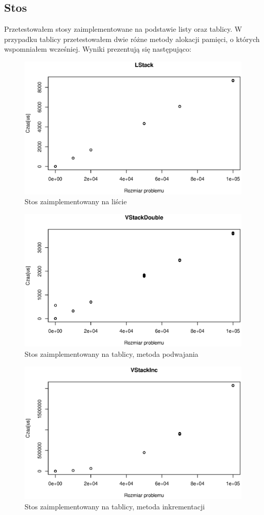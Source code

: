 \documentclass[10pt,a4paper]{article}
\begin{document}
\subsection{Stos}

Przetestowałem stosy zaimplementowane na podstawie listy oraz tablicy. W przypadku tablicy
przetestowałem dwie różne metody alokacji pamięci, o których wspomniałem wcześniej. Wyniki 
prezentują się następująco:

\begin{figure}[H]
	\centering
	\includegraphics[width=0.7\linewidth]{./Wykresy/LStack}
	\caption{Stos zaimplementowany na liście}
	\label{fig:LStack}
\end{figure}

\begin{figure}[H]
	\centering
	\includegraphics[width=0.7\linewidth]{./Wykresy/VStackDouble}
	\caption{Stos zaimplementowany na tablicy, metoda podwajania}
	\label{fig:VStackDouble}
\end{figure}

\begin{figure}[H]
	\centering
	\includegraphics[width=0.7\linewidth]{./Wykresy/VStackInc}
	\caption{Stos zaimplementowany na tablicy, metoda inkrementacji}
	\label{fig:VStackInc}
\end{figure}
\end{document}
